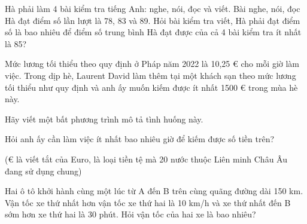 \begin{practice}
\begin{questions}[resume=SBT]
        \answerline
        \answerline
        \answerline

        \item Hà phải làm 4 bài kiểm tra tiếng Anh: nghe, nói, đọc và viết. Bài nghe, nói, đọc Hà đạt điểm số lần lượt là 78, 83 và 89. Hỏi bài kiểm tra viết, Hà phải đạt điểm số là bao nhiêu để điểm số trung bình Hà đạt được của cả 4 bài kiểm tra ít nhất là 85?

        \answerline
        \answerline
        \answerline

        \item Mức lương tối thiểu theo quy định ở Pháp năm 2022 là 10,25 € cho mỗi giờ làm việc. Trong dịp hè, Laurent David làm thêm tại một khách sạn theo mức lương tối thiểu như quy định và anh ấy muốn kiếm được ít nhất 1500 € trong mùa hè này.
        \begin{questions}
            \item Hãy viết một bất phương trình mô tả tình huống này.

            \answerline
            \answerline

            \item Hỏi anh ấy cần làm việc ít nhất bao nhiêu giờ để kiếm được số tiền trên?

            \answerline
            \answerline
        \end{questions}

        (€ là viết tắt của Euro, là loại tiền tệ mà 20 nước thuộc Liên minh Châu Âu đang sử dụng chung)

        \item Hai ô tô khởi hành cùng một lúc từ A đến B trên cùng quãng đường dài 150 km. Vận tốc xe thứ nhất hơn vận tốc xe thứ hai là 10 km/h và xe thứ nhất đến B sớm hơn xe thứ hai là 30 phút. Hỏi vận tốc của hai xe là bao nhiêu?

        \answerline
        \answerline
        \answerline
    \end{questions}
\end{practice}
